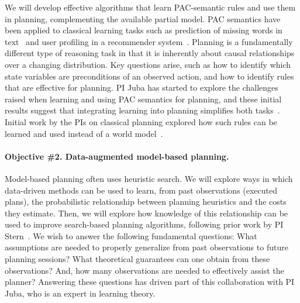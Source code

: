 \documentclass[12pt]{article}
\begin{document}
We will develop effective algorithms that learn PAC-semantic rules 
and use them in planning, complementing the available partial model. %
PAC semantics have been applied to classical learning tasks such as prediction of missing words in text~\cite{michael2008first} and user profiling in a recommender system~\cite{semeraro2009knowledge}. Planning is a fundamentally different type of reasoning task in that it is inherently about causal relationships over a changing distribution. Key questions arise, such as how to identify which state variables are preconditions of an observed action, and how to identify rules that are effective for planning. %
PI Juba has started to explore the challenges raised when learning and using PAC semantics for planning, and these initial results suggest that integrating learning into planning simplifies both tasks~\cite{juba2016jmlr}. Initial work by the PIs on classical planning explored how such rules can be learned and used instead of a world model~\cite{stern2017efficientAndSafe}. 


\vspace{-0.35cm}
\paragraph{Objective \#2. Data-augmented model-based planning.}
Model-based planning often uses heuristic search. We will explore ways in which data-driven methods can be used to learn, from past observations (executed plans), the probabilistic relationship between planning heuristics and the costs they estimate. Then, we will explore how knowledge of this relationship can be used to improve search-based planning algorithms, following prior work by PI Stern~\cite{stern2011probably,stern2012exploring,stern2014potential}.
We wish to answer the following fundamental questions: What assumptions are needed to properly generalize from past observations to future planning sessions? What theoretical guarantees can one obtain from these observations? And, how many observations are needed to effectively assist the planner? Answering these questions has driven part of this collaboration with PI Juba, who is an expert in learning theory. 
\end{document}
